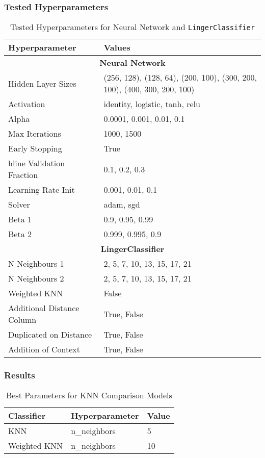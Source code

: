 \documentclass[a4paper, 12pt]{report}
\begin{document}
\subsubsection{Tested Hyperparameters}
\begin{table}[H]
    \centering
    \caption{Tested Hyperparameters for Neural Network and \texttt{LingerClassifier}}
    \label{tab:hyperparameters_raisin}
    \small
    \begin{tabular}{|l|l|}
    \hline
    \textbf{Hyperparameter} & \textbf{Values} \\ \hline
    \multicolumn{2}{|c|}{\textbf{Neural Network}} \\ \hline
    Hidden Layer Sizes & (256, 128), (128, 64), (200, 100), (300, 200, 100), (400, 300, 200, 100) \\ \hline
    Activation & identity, logistic, tanh, relu \\ \hline
    Alpha & 0.0001, 0.001, 0.01, 0.1 \\ \hline
    Max Iterations & 1000, 1500 \\ \hline
    Early Stopping & True \\hline
    Validation Fraction & 0.1, 0.2, 0.3 \\ \hline
    Learning Rate Init & 0.001, 0.01, 0.1 \\ \hline
    Solver & adam, sgd \\ \hline
    Beta 1 & 0.9, 0.95, 0.99 \\ \hline
    Beta 2 & 0.999, 0.995, 0.9 \\ \hline
    \multicolumn{2}{|c|}{\textbf{LingerClassifier}} \\ \hline
    N Neighbours 1 & 2, 5, 7, 10, 13, 15, 17, 21 \\ \hline
    N Neighbours 2 & 2, 5, 7, 10, 13, 15, 17, 21 \\ \hline
    Weighted KNN & False \\ \hline
    Additional Distance Column & True, False \\ \hline
    Duplicated on Distance & True, False \\ \hline
    Addition of Context & True, False \\ \hline
    \end{tabular}
\end{table}
\clearpage
\subsubsection{Results}

\begin{table}[H]
    \centering
    \caption{Best Parameters for KNN Comparison Models}
    \label{tab:best_parameters_combined_knn_exp3}
    \begin{tabular}{|l|l|l|}
    \toprule
    \textbf{Classifier} & \textbf{Hyperparameter} & \textbf{Value} \\
    \midrule
    KNN & n\_neighbors & 5 \\
    Weighted KNN & n\_neighbors & 10 \\
    \bottomrule
\end{tabular}
\end{table}
\end{document}
